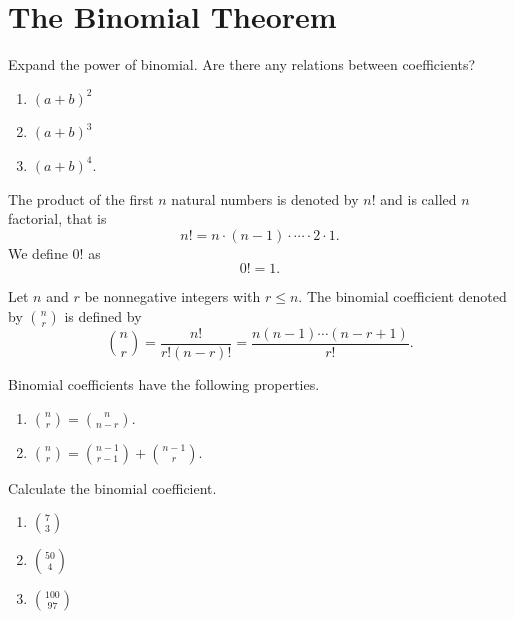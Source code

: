 
\section{The Binomial Theorem}

\begin{example}
    Expand the power of binomial. Are there any relations between coefficients?
\begin{enumerate}
    \item $(a+b)^2$
    \item $(a+b)^3$
    \item $(a+b)^4$.
\end{enumerate}
\end{example}
\vspace*{6\baselineskip}


\begin{definition}
The product of the first $n$ natural numbers is denoted by $n!$ and is called $n$ factorial, that is
\[n!=n\cdot (n-1)\cdot \cdots \cdot 2\cdot 1.\]
We define $0!$ as
\[0!=1.\]
\end{definition}

\begin{definition}
    Let $n$ and $r$ be nonnegative integers with $r\le n$. The binomial coefficient denoted by $\binom{n}{r}$ is defined by
    \[\binom{n}{r}=\dfrac{n!}{r!(n-r)!}=\dfrac{n(n-1)\cdots(n-r+1)}{r!}.\]
\end{definition}

\begin{theorem} Binomial coefficients have the following properties.
    \begin{enumerate}[sepno]
        \item $\binom{n}{r}=\binom{n}{n-r}$.
        \item $\binom{n}{r}=\binom{n-1}{r-1}+\binom{n-1}{r}$.
    \end{enumerate}
\end{theorem}

\begin{example}
    Calculate the binomial coefficient.
    \begin{enumerate}
        \item $\binom{7}{3}$
        \item $\binom{50}{4}$
        \item $\binom{100}{97}$
    \end{enumerate}
\end{example}

